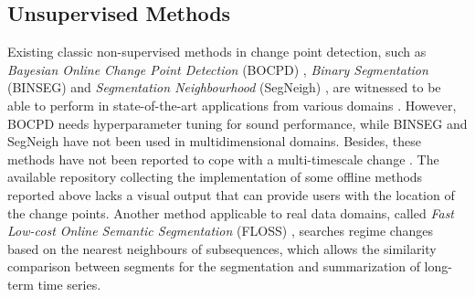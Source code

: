 \subsection{Unsupervised Methods}

Existing classic non-supervised methods in change point detection,  such as \textit{Bayesian Online Change Point Detection} (BOCPD) \cite{bocpd}, \textit{Binary Segmentation} (BINSEG) \cite{binseg} and \textit{Segmentation Neighbourhood} (SegNeigh) \cite{segneigh}, are witnessed to be able to perform in state-of-the-art applications from various domains \cite{cpd_alan}. However, BOCPD needs hyperparameter tuning for sound performance, while BINSEG and SegNeigh have not been used in multidimensional domains. Besides, these methods have not been reported to cope with a multi-timescale change \cite{cpd_alan}. The available repository \cite{cpd_alan} collecting the implementation of some offline methods \cite{review_2} reported above lacks a visual output that can provide users with the location of the change points. Another method applicable to real data domains, called \textit{Fast Low-cost Online Semantic Segmentation} (FLOSS) \cite{eamonn1, eamonn_segmentation}, searches regime changes based on the nearest neighbours of subsequences, which allows the similarity comparison between segments for the segmentation and summarization of long-term time series.


